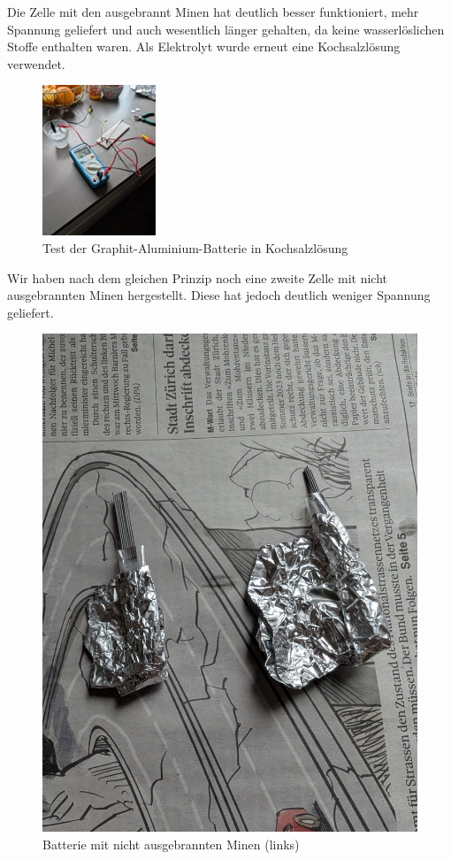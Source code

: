 \documentclass[ngerman, a4paper,12pt]{article}
\begin{document}
\vspace{12px}

\noindent Die Zelle mit den ausgebrannt Minen hat deutlich besser funktioniert, mehr Spannung geliefert und auch wesentlich länger gehalten, da keine wasserlöslichen Stoffe enthalten waren. Als Elektrolyt wurde erneut eine Kochsalzlösung verwendet.
\begin{figure}[htbp]
	\centering
	\includegraphics[height=0.3\textheight]{Bild11.jpg}
	\caption{Test der Graphit-Aluminium-Batterie in Kochsalzlösung}\label{fig:bild11}
\end{figure}
\newpage

\noindent  
Wir haben nach dem gleichen Prinzip noch eine zweite Zelle mit nicht ausgebrannten Minen hergestellt. Diese hat jedoch deutlich weniger Spannung geliefert.
\begin{figure}[htbp]
	\centering
	\includegraphics[height=0.3\textheight]{Bild12.jpg}
	\caption{Batterie mit nicht ausgebrannten Minen (links)}\label{fig:bild12}
\end{figure}
\end{document}
